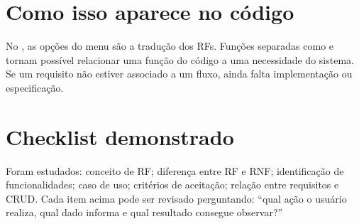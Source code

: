 \documentclass[11pt,a4paper]{article}
\begin{document}
\section*{Como isso aparece no código}
No , as opções do menu são a tradução dos RFs. Funções separadas como  e  tornam possível relacionar uma função do código a uma necessidade do sistema. Se um requisito não estiver associado a um fluxo, ainda falta implementação ou especificação.
\section*{Checklist demonstrado}
Foram estudados: conceito de RF; diferença entre RF e RNF; identificação de funcionalidades; caso de uso; critérios de aceitação; relação entre requisitos e CRUD. Cada item acima pode ser revisado perguntando: ``qual ação o usuário realiza, qual dado informa e qual resultado consegue observar?''
\end{document}

